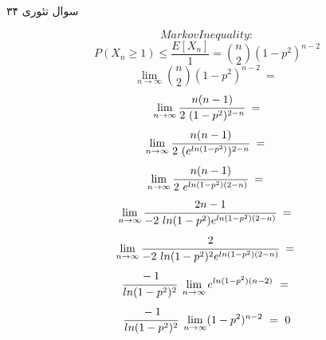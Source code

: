 سوال تئوری ۳۴

$$Markov Inequality:$$
$$P(X_n \ge 1) \le \frac{E[X_n]}{1} = \binom{n}{2}(1-p^2)^{n-2}$$
$$\lim\limits_{n \to \infty} \binom{n}{2}(1-p^2)^{n-2} \ = \ $$
$$\lim\limits_{n \to \infty} \cfrac{n(n-1)}{2 \ (1-p^2)^{2-n}} \ =$$
$$\lim\limits_{n \to \infty} \cfrac{n(n-1)}{2 \ (e^{ln(1-p^2)})^{2-n}} \ = \ $$
$$\lim\limits_{n \to \infty} \cfrac{n(n-1)}{2 \ e^{ln(1-p^2)(2-n)}} \ = \ $$
$$\lim\limits_{n \to \infty} \cfrac{2n-1}{-2 \ ln(1-p^2)e^{ln(1-p^2)(2-n)}} \ = \ $$
$$\lim\limits_{n \to \infty} \cfrac{2}{-2 \ ln(1-p^2)^2 e^{ln(1-p^2)(2-n)}} \ = \ $$
$$\cfrac{-1}{ln(1-p^2)^2} \ \lim\limits_{n \to \infty} e^{ln(1-p^2)(n-2)} \ = \ $$
$$\cfrac{-1}{ln(1-p^2)^2} \ \lim\limits_{n \to \infty} (1-p^2)^{n-2} \ = \ 0 $$